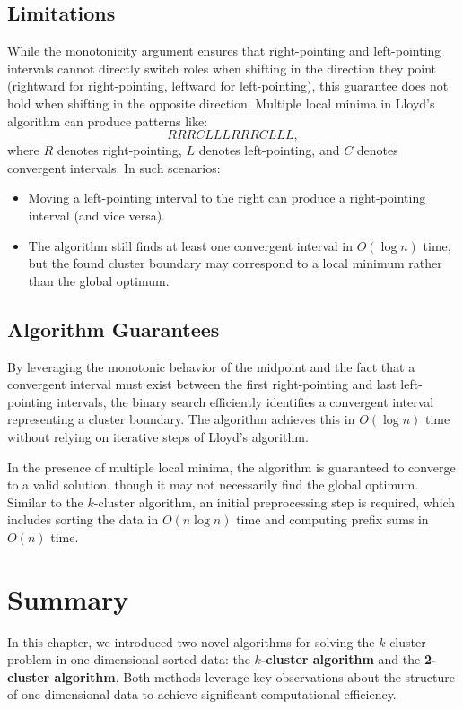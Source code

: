\subsection{Limitations}
While the monotonicity argument ensures that right-pointing and left-pointing intervals cannot directly switch roles when shifting in the direction they point (rightward for right-pointing, leftward for left-pointing), this guarantee does not hold when shifting in the opposite direction. Multiple local minima in Lloyd’s algorithm can produce patterns like:
\[
RRRCLLLRRRCLLL,
\]
where \(R\) denotes right-pointing, \(L\) denotes left-pointing, and \(C\) denotes convergent intervals. In such scenarios:
\begin{itemize}
    \item Moving a left-pointing interval to the right can produce a right-pointing interval (and vice versa).
    \item The algorithm still finds at least one convergent interval in \(O(\log n)\) time, but the found cluster boundary may correspond to a local minimum rather than the global optimum.
\end{itemize}

\subsection{Algorithm Guarantees}

By leveraging the monotonic behavior of the midpoint and the fact that a convergent interval must exist between the first right-pointing and last left-pointing intervals, the binary search efficiently identifies a convergent interval representing a cluster boundary. The algorithm achieves this in \(O(\log n)\) time without relying on iterative steps of Lloyd's algorithm.

In the presence of multiple local minima, the algorithm is guaranteed to converge to a valid solution, though it may not necessarily find the global optimum. Similar to the \(k\)-cluster algorithm, an initial preprocessing step is required, which includes sorting the data in \(O(n \log n)\) time and computing prefix sums in \(O(n)\) time.


\section{Summary}

In this chapter, we introduced two novel algorithms for solving the \(k\)-cluster problem in one-dimensional sorted data: the \textbf{\(k\)-cluster algorithm} and the \textbf{2-cluster algorithm}. Both methods leverage key observations about the structure of one-dimensional data to achieve significant computational efficiency.

